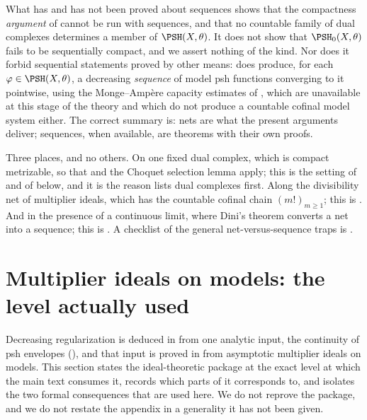 \begin{warning}{What has and has not been proved about sequences}
 shows that the compactness
\emph{argument} of  cannot be run with
sequences, and that no countable family of dual complexes determines a
member of \(\PSH(X,\theta)\).  It does not show that
\(\PSH_0(X,\theta)\) fails to be sequentially compact, and we assert
nothing of the kind.  Nor does it forbid sequential statements proved by
other means:  does produce, for each
\(\varphi\in\PSH(X,\theta)\), a decreasing \emph{sequence} of model psh
functions converging to it pointwise, using the Monge--Amp\`ere capacity
estimates of , which are unavailable at this stage
of the theory and which do not produce a countable cofinal model system
either.  The correct summary is: nets are what the present arguments
deliver; sequences, when available, are theorems with their own proofs.
\end{warning}

\begin{remark}
\label{rem:ch22-legitimate-sequences}
Three places, and no others.  On one fixed dual complex, which is compact
metrizable, so that  and the Choquet selection
lemma  apply; this is the setting of
 and of
 below, and it is the reason
 lists dual complexes first.  Along the
divisibility net of multiplier ideals, which has the countable cofinal chain
\((m!)_{m\geq1}\); this is .  And in the
presence of a continuous limit, where Dini's theorem converts a net into a
sequence; this is .  A
checklist of the general net-versus-sequence traps is
.
\end{remark}

\section{Multiplier ideals on models: the level actually used}
\label{sec:ch22-multiplier}

Decreasing regularization is deduced in
 from one analytic input, the continuity of
psh envelopes (), and that input is proved
in  from asymptotic multiplier ideals on models.
This section states the ideal-theoretic package at the exact level at which
the main text consumes it, records which parts of
 it corresponds to, and isolates the two formal
consequences that are used here.  We do not reprove the package, and we do
not restate the appendix in a generality it has not been given.

